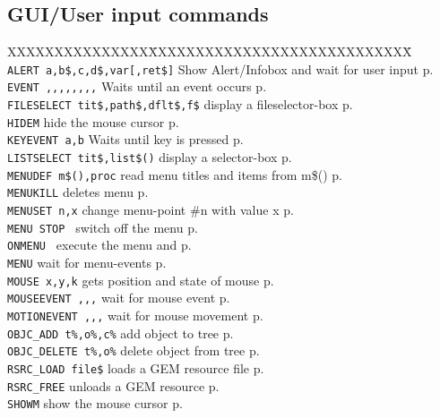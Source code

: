\subsection{GUI/User input commands}
\begin{tabbing}
XXXXXXXXXXXXXXX\=XXXXXXXXXXXXXXXXXXXXXXXXXXXX\=\kill\\
\verb|ALERT a,b$,c,d$,var[,ret$]| \> Show Alert/Infobox and wait for user input\> p.\pageref{ALERT}\\
\verb|EVENT ,,,,,,,,|	 \> Waits until an event occurs\> p.\pageref{EVENT}\\
\verb|FILESELECT tit$,path$,dflt$,f$|  \> display a fileselector-box\> p.\pageref{FILESELECT}\\
\verb|HIDEM|  	         \> hide the mouse cursor\> p.\pageref{HIDEM}\\
\verb|KEYEVENT a,b|	 \> Waits until key is pressed\> p.\pageref{KEYEVENT}\\
\verb|LISTSELECT tit$,list$()|  \> display a selector-box\> p.\pageref{LISTSELECT}\\

\verb|MENUDEF m$(),proc| \> read menu titles and items from m\$()\> p.\pageref{MENUDEF}\\
\verb|MENUKILL|		 \> deletes menu\> p.\pageref{MENUKILL}\\
\verb|MENUSET n,x|	 \> change menu-point \#n with value x\> p.\pageref{MENUSET}\\
\verb|MENU STOP	|	 \> switch off the menu\> p.\pageref{MENUbSTOP}\\
\verb|ONMENU | 		 \> execute the menu and\> p.\pageref{ONMENU}\\
\verb|MENU|		 \> wait for menu-events\> p.\pageref{MENU}\\
\verb|MOUSE x,y,k|	 \> gets position and state of mouse\> p.\pageref{MOUSE}\\
\verb|MOUSEEVENT ,,,|	 \> wait for mouse event\> p.\pageref{MOUSEEVENT}\\
\verb|MOTIONEVENT ,,,|	 \> wait for mouse movement\> p.\pageref{MOTIONEVENT}\\
\verb|OBJC_ADD t%,o%,c%| \> add object to tree\> p.\pageref{OBJCiADD}\\
\verb|OBJC_DELETE t%,o%| \> delete object from tree\> p.\pageref{OBJCiDELETE}\\
\verb|RSRC_LOAD file$|   \> loads a GEM resource file\> p.\pageref{RSRCiLOAD}\\
\verb|RSRC_FREE|         \> unloads a GEM resource \> p.\pageref{RSRCiFREE}\\
\verb|SHOWM|  	         \> show the mouse cursor\> p.\pageref{SHOWM}\\
\end{tabbing}

